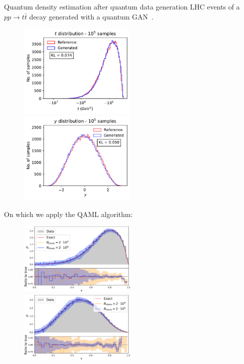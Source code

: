 \documentclass[20pt, final]{beamer}
\newlength{\colwidth}
\begin{document}
\begin{frame}[t]
\begin{columns}[t]
\begin{column}{\colwidth}
\begin{block}{Quantum density estimation after quantum data generation}
  LHC events of a $pp\to t\bar{t}$ decay generated with a quantum 
  GAN~\cite{Bravo_Prieto_2022}. 

    \begin{figure}
    \includegraphics[width=0.5\textwidth]{figures/t_qgan.pdf}%
    \includegraphics[width=0.5\textwidth]{figures/y_qgan.pdf}%
    \end{figure}

  On which we apply the QAML algorithm:

    \begin{figure}
    \includegraphics[width=0.5\textwidth]{figures/t.pdf}%
    \includegraphics[width=0.5\textwidth]{figures/rapidity.pdf}%
    \end{figure}
    


\end{block}
\end{column}
\end{columns}
\end{frame}
\end{document}
